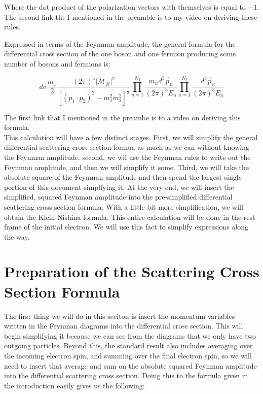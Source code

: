 \documentclass[a4]{article}
\begin{document}
    Where the dot product of the polarization vectors with themselves is equal to $-1$. The second link tht I mentioned in the preamble
    is to my video on deriving these rules.

    Expressed in terms of the Feynman amplitude, the general formula for the differential cross section of the one boson and one 
    fermion producing some number of bosons and fermions is:

    \begin{center}
        \begin{framed}
            \begin{equation}
                d \sigma \frac{m_1}{2} \frac{(2 \pi)^4 |\mathscr{M}_{fi}|^2}{[(p_1 \cdot p_2)^2 - m_1^2 m_2^2]^{\frac{1}{2}}} \prod_{n = 1}^{N_f} \frac{m_n d^3 \vec{p}_n}{(2 \pi)^3 E_n} \prod_{n = 1}^{N_b} \frac{d^3 \vec{p}_n}{(2 \pi)^3 E_n}
            \end{equation}
        \end{framed}
    \end{center}

    The first link that I mentioned in the preambe is to a video on deriving this formula. \\

    This calculation will have a few distinct stages. First, we will simplify the general differential scattering cross section formua as much
    as we can without knowing the Feynman amplitude. second, we wil use the Feynman rules to write out the Feynman amplitude,
    and then we will simplify it some. Third, we will take the absolute square of the Feynman amplitude and then spend the largest
    single portion of this document simplfying it. At the very end, we will insert the simplified, squared Feynman amplitude into the
    pre-simplified differential scattering cross section formula. With a little bit more simplification, we will obtain the Klein-Nishina
    formula. This entire calculation will be done in the rest frame of the initial electron. We will use this fact to simplify expressions
    along the way.

    \section*{Preparation of the Scattering Cross Section Formula}

    The first thing we will do in this seciton is insert the momentum variables written in the Feynman diagrams into the differential
    cross section. This will begin simplifying it because we can see from the diagrams that we only have two outgoing
    particles. Beyond this, the standard result also includes averaging over the incoming electron spin, and summing over the final
    electron spin, so we will need to insert that average and sum on the absolute squared Feynman amplitude into the differential
    scattering cross section. Doing this to the formula given in the introduction easily gives us the following:
\end{document}
